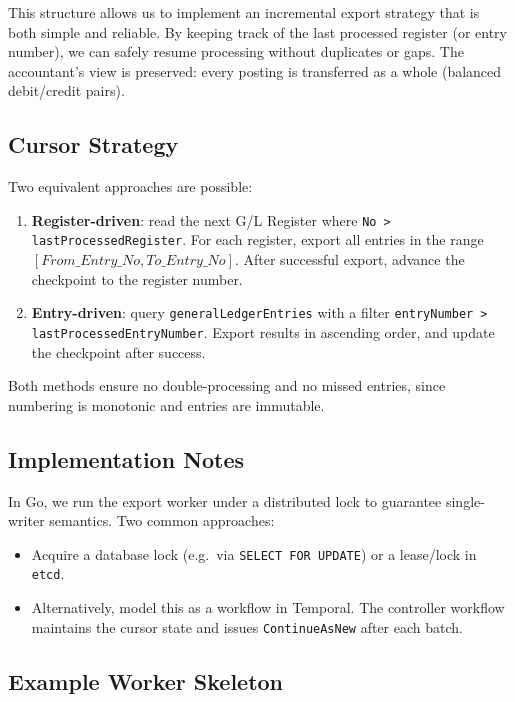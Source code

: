 \documentclass[a4paper,10pt]{article}
\begin{document}
This structure allows us to implement an incremental export strategy that is both simple and reliable. By keeping track of the last processed register (or entry number), we can safely resume processing without duplicates or gaps. The accountant’s view is preserved: every posting is transferred as a whole (balanced debit/credit pairs).

\subsection{Cursor Strategy}

Two equivalent approaches are possible:

\begin{enumerate}
  \item \textbf{Register-driven}: read the next G/L Register where \texttt{No > lastProcessedRegister}. For each register, export all entries in the range 
  \([From\_Entry\_No, To\_Entry\_No]\). After successful export, advance the checkpoint to the register number.
  \item \textbf{Entry-driven}: query \texttt{generalLedgerEntries} with a filter \texttt{entryNumber > lastProcessedEntryNumber}. Export results in ascending order, and update the checkpoint after success.
\end{enumerate}

Both methods ensure no double-processing and no missed entries, since numbering is monotonic and entries are immutable.

\subsection{Implementation Notes}

In Go, we run the export worker under a distributed lock to guarantee single-writer semantics. Two common approaches:

\begin{itemize}
  \item Acquire a database lock (e.g.\ via \texttt{SELECT FOR UPDATE}) or a lease/lock in \texttt{etcd}.
  \item Alternatively, model this as a workflow in Temporal. The controller workflow maintains the cursor state and issues \texttt{ContinueAsNew} after each batch.
\end{itemize}

\subsection{Example Worker Skeleton}
\end{document}
